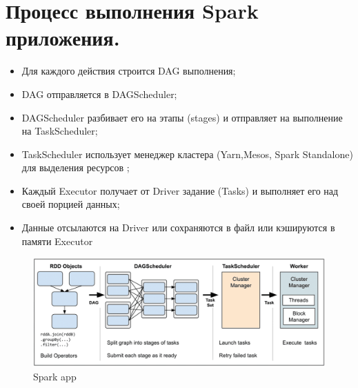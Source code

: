 \section{Процесс выполнения Spark приложения.}

\begin{itemize}
    \item Для каждого действия строится DAG выполнения;
    \item DAG отправляется в DAGScheduler;
    \item DAGScheduler разбивает его на этапы (stages) и отправляет
    на выполнение на TaskScheduler;
    \item TaskScheduler использует менеджер кластера (Yarn,Mesos,
    Spark Standalone) для выделения ресурсов ;
    \item Каждый Executor получает от Driver задание (Tasks) и
    выполняет его над своей порцией данных;
    \item Данные отсылаются на Driver или сохраняются в файл или
    кэшируются в памяти Executor
\end{itemize}

\begin{figure}[h]
	\centering
	\begin{minipage}[b]{0.8\textwidth}
		\includegraphics[width=\textwidth]{images/sparkapp.png}
		\caption{Spark app}
	\end{minipage}
\end{figure}
